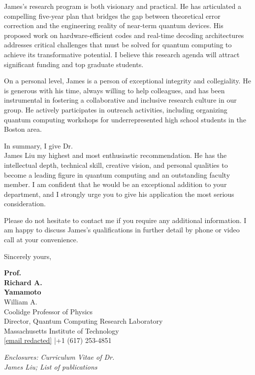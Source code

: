 \documentclass[12pt,a4paper]{article}
\begin{document}
James's research program is both visionary and practical. He has articulated a compelling five-year plan that bridges the gap between theoretical error correction and the engineering reality of near-term quantum devices. His proposed work on hardware-efficient codes and real-time decoding architectures addresses critical challenges that must be solved for quantum computing to achieve its transformative potential. I believe this research agenda will attract significant funding and top graduate students.

On a personal level, James is a person of exceptional integrity and collegiality. He is generous with his time, always willing to help colleagues, and has been instrumental in fostering a collaborative and inclusive research culture in our group. He actively participates in outreach activities, including organizing quantum computing workshops for underrepresented high school students in the Boston area.

In summary, I give Dr.\\ James Liu my highest and most enthusiastic recommendation. He has the intellectual depth, technical skill, creative vision, and personal qualities to become a leading figure in quantum computing and an outstanding faculty member. I am confident that he would be an exceptional addition to your department, and I strongly urge you to give his application the most serious consideration.

Please do not hesitate to contact me if you require any additional information. I am happy to discuss James's qualifications in further detail by phone or video call at your convenience.

\vspace{0.8cm}

Sincerely yours,

\vspace{1.2cm}

\textbf{Prof.\\ Richard A.\\ Yamamoto}\\
William A.\\ Coolidge Professor of Physics\\
Director, Quantum Computing Research Laboratory\\
Massachusetts Institute of Technology\\
\href{mailto:[email redacted]}{[email redacted]} \quad|\quad +1 (617) 253-4851

\vspace{1cm}

{\small\color{rulecolor}\textit{Enclosures: Curriculum Vitae of Dr.\\ James Liu; List of publications}}
\end{document}
